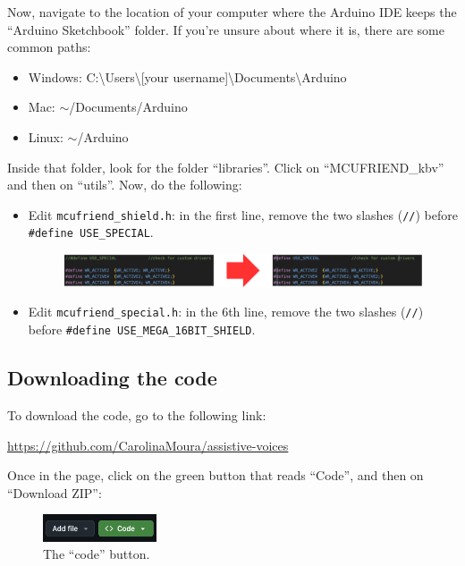 \documentclass{article}
\begin{document}
\noindent
Now, navigate to the location of your computer where the Arduino IDE keeps the ``Arduino Sketchbook'' folder. If you're unsure about where it is, there are some common paths:

\begin{itemize}
    \item Windows: C:\textbackslash Users\textbackslash [your username]\textbackslash Documents\textbackslash Arduino
    \item Mac: \(\sim \)/Documents/Arduino
    \item Linux: \(\sim \)/Arduino
\end{itemize}

Inside that folder, look for the folder ``libraries''. Click on ``MCUFRIEND\_kbv'' and then on ``utils''. Now, do the following:

\begin{itemize}
    \item Edit \texttt{mcufriend\_shield.h}: in the first line, remove the two slashes (\texttt{//}) before \texttt{\#define USE\_SPECIAL}.
    \begin{figure}[h]
        \centering
        \includegraphics[width=1.3\textwidth]{../images/mcufriend_shield.png}
        \end{figure}
    \item Edit \texttt{mcufriend\_special.h}: in the 6th line, remove the two slashes (\texttt{//}) before \texttt{\#define USE\_MEGA\_16BIT\_SHIELD}.
\end{itemize}

\newpage
\subsection{Downloading the code}
To download the code, go to the following link:

\href{https://github.com/CarolinaMoura/assistive-voices}{https://github.com/CarolinaMoura/assistive-voices}

Once in the page, click on the green button that reads ``Code'', and then on ``Download ZIP'':

\begin{figure}[h]
\centering
\includegraphics[width=0.3\textwidth]{../images/code.png}
\caption{The ``code'' button.}
\end{figure}
\end{document}
